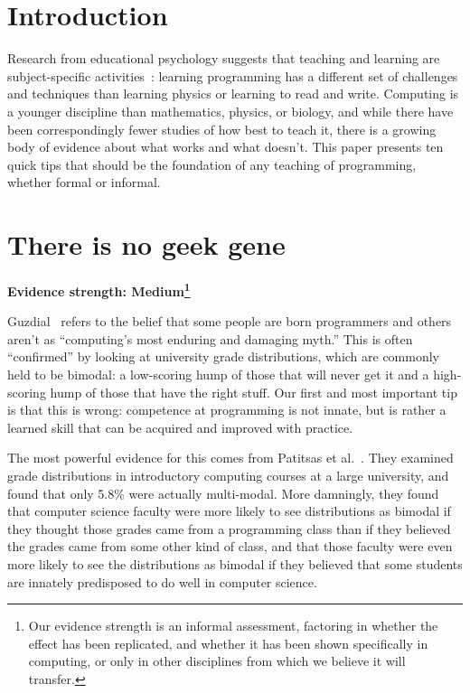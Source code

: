 \documentclass[10pt,letterpaper]{article}
\newcommand{\rulemajor}[2]{\section{#1}\label{#2}}
\newcommand{\evidence}[1]{\vspace{-0.3cm}\textbf{Evidence strength: #1}\vspace{0.5cm}}
\begin{document}


\section*{Introduction}

Research from educational psychology suggests that teaching and learning are subject-specific
activities~\cite{mayer-subject}: learning programming has a different set of challenges and techniques
than learning physics or learning to read and write.  Computing is a younger discipline than
mathematics, physics, or biology, and while there have been correspondingly fewer studies of how best to teach it,
there is a growing body of evidence about what works and what doesn't.
This paper presents ten quick tips that should be the foundation of any teaching of programming, whether
formal or informal.

\rulemajor{There is no geek gene}{gene}
\evidence{Medium\footnote{Our evidence strength is an informal assessment, factoring in whether the effect has been replicated, and whether it has been shown specifically in computing, or only in other disciplines from which we believe it will transfer.}}

Guzdial~\cite{guzdial-myths} refers to the belief that some people are born programmers and others aren't
as ``computing's most enduring and damaging myth.''
This is often ``confirmed'' by looking at university grade distributions,
which are commonly held to be bimodal:
a low-scoring hump of those that will never get it
and a high-scoring hump of those that have the right stuff.
Our first and most important tip is that this is wrong:
competence at programming is not innate,
but is rather a learned skill that can be acquired and improved with practice.

The most powerful evidence for this comes from Patitsas et al.~\cite{patitsas-bimodal}.
They examined grade distributions in introductory computing courses at a large university,
and found that only 5.8\% were actually multi-modal.
More damningly,
they found that computer science faculty were more likely to see distributions as bimodal
if they thought those grades came from a programming class
than if they believed the grades came from some other kind of class,
and that those faculty were even more likely to see the distributions as bimodal
if they believed that some students are innately predisposed to do well in computer science.
\end{document}
